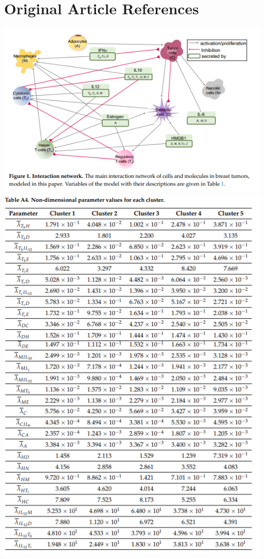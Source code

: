 \documentclass{article}
\begin{document}
\section{Original Article References}
\label{appendix:article}
\includegraphics[scale=.75]{fig5.PNG}\\
\includegraphics[scale=.75]{a4.PNG}\label{Table A4}\\
\end{document}
